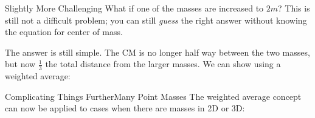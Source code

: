 \documentclass[12pt,compress,aspectratio=169]{beamer}
\begin{document}
 
\begin{frame}{Slightly More Challenging}
  What if one of the masses are increased to $2m$? This is still not a
  difficult problem; you can still \emph{guess} the right answer without
  knowing the equation for center of mass. 
  \begin{center}
  \end{center}
  The answer is still simple. The CM is no longer half way between the two
  masses, but now $\frac13$ the total distance from the larger masses. We can
  show using a weighted average:
  
\end{frame}



\begin{frame}{Complicating Things Further}{Many Point Masses}
  The weighted average concept can now be applied to cases when there are
  masses in 2D or 3D:
  \begin{center}
    \vspace{-.2in}
  \end{center}
\end{frame}
\end{document}
